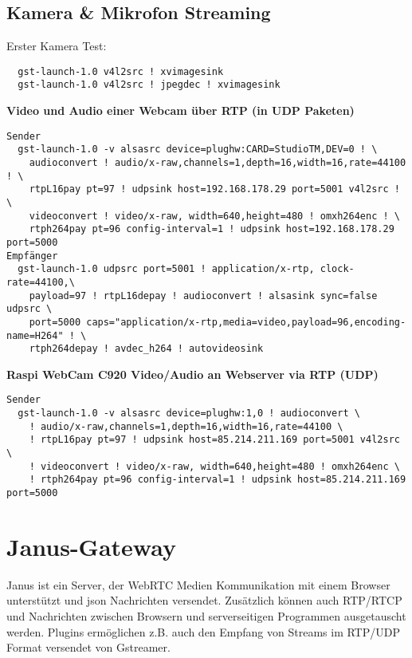 \subsection{Kamera \& Mikrofon Streaming}
Erster Kamera Test:
\begin{verbatim}
  gst-launch-1.0 v4l2src ! xvimagesink
  gst-launch-1.0 v4l2src ! jpegdec ! xvimagesink
\end{verbatim}

\textbf{Video und Audio einer Webcam über RTP (in UDP Paketen)}
\begin{verbatim}
Sender
  gst-launch-1.0 -v alsasrc device=plughw:CARD=StudioTM,DEV=0 ! \
    audioconvert ! audio/x-raw,channels=1,depth=16,width=16,rate=44100 ! \
    rtpL16pay pt=97 ! udpsink host=192.168.178.29 port=5001 v4l2src ! \
    videoconvert ! video/x-raw, width=640,height=480 ! omxh264enc ! \
    rtph264pay pt=96 config-interval=1 ! udpsink host=192.168.178.29 port=5000
Empfänger
  gst-launch-1.0 udpsrc port=5001 ! application/x-rtp, clock-rate=44100,\
    payload=97 ! rtpL16depay ! audioconvert ! alsasink sync=false udpsrc \
    port=5000 caps="application/x-rtp,media=video,payload=96,encoding-name=H264" ! \
    rtph264depay ! avdec_h264 ! autovideosink
\end{verbatim}

\textbf{Raspi WebCam C920 Video/Audio an Webserver via RTP (UDP)}
\begin{verbatim}
Sender
  gst-launch-1.0 -v alsasrc device=plughw:1,0 ! audioconvert \
    ! audio/x-raw,channels=1,depth=16,width=16,rate=44100 \
    ! rtpL16pay pt=97 ! udpsink host=85.214.211.169 port=5001 v4l2src \
    ! videoconvert ! video/x-raw, width=640,height=480 ! omxh264enc \
    ! rtph264pay pt=96 config-interval=1 ! udpsink host=85.214.211.169 port=5000
\end{verbatim}

\section{Janus-Gateway} \label{RefJanus}
Janus ist ein Server, der WebRTC Medien Kommunikation mit einem Browser unterstützt und json Nachrichten versendet. Zusätzlich können auch RTP/RTCP und Nachrichten zwischen Browsern und serverseitigen Programmen ausgetauscht werden. Plugins ermöglichen z.B. auch den Empfang von Streams im RTP/UDP Format versendet von Gstreamer. 

